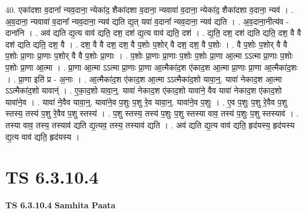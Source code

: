 \documentclass[17pt]{extarticle}
\begin{document}
40. एका॑दशा व॒दाना᳚ न्यव॒दाना॒ न्येका॑द॒ शैका॑दशा व॒दाना॒ न्यवावा॑ व॒दाना॒ न्येका॑द॒ शैका॑दशा व॒दाना॒ न्यव॑ । . अ॒व॒दाना॒ न्यवावा॑ व॒दाना᳚ न्यव॒दाना॒ न्यव॑ द्यति द्य॒त् यवा॑ व॒दाना᳚ न्यव॒दाना॒ न्यव॑ द्यति । . अ॒व॒दाना॒नीत्य॑व - दाना॑नि । . अव॑ द्यति द्य॒त्य वाव॑ द्यति॒ दश॒ दश॑ द्य॒त्य वाव॑ द्यति॒ दश॑ । . द्य॒ति॒ दश॒ दश॑ द्यति द्यति॒ दश॒ वै वै दश॑ द्यति द्यति॒ दश॒ वै । . दश॒ वै वै दश॒ दश॒ वै प॒शोः प॒शोर् वै दश॒ दश॒ वै प॒शोः । . वै प॒शोः प॒शोर् वै वै प॒शोः प्रा॒णाः प्रा॒णाः प॒शोर् वै वै प॒शोः प्रा॒णाः । . प॒शोः प्रा॒णाः प्रा॒णाः प॒शोः प॒शोः प्रा॒णा आ॒त्मा ऽऽत्मा प्रा॒णाः प॒शोः प॒शोः प्रा॒णा आ॒त्मा । . प्रा॒णा आ॒त्मा ऽऽत्मा प्रा॒णाः प्रा॒णा आ॒त्मैका॑द॒श ए॑काद॒श आ॒त्मा प्रा॒णाः प्रा॒णा आ॒त्मैका॑द॒शः । . प्रा॒णा इति॑ प्र - अ॒नाः । . आ॒त्मैका॑द॒श ए॑काद॒श आ॒त्मा ऽऽत्मैका॑द॒शो यावा॒न्॒. यावा॑ नेकाद॒श आ॒त्मा ऽऽत्मैका॑द॒शो यावान्॑ । . ए॒का॒द॒शो यावा॒न्॒. यावा॑ नेकाद॒श ए॑काद॒शो यावा॑ने॒ वैव यावा॑ नेकाद॒श ए॑काद॒शो यावा॑ने॒व । . यावा॑ ने॒वैव यावा॒न्॒. यावा॑ने॒व प॒शुः प॒शु रे॒व यावा॒न्॒. यावा॑ने॒व प॒शुः । . ए॒व प॒शुः प॒शु रे॒वैव प॒शु स्तस्य॒ तस्य॑ प॒शु रे॒वैव प॒शु स्तस्य॑ । . प॒शु स्तस्य॒ तस्य॑ प॒शुः प॒शु स्तस्या वाव॒ तस्य॑ प॒शुः प॒शु स्तस्याव॑ । . तस्या वाव॒ तस्य॒ तस्याव॑ द्यति द्य॒त्यव॒ तस्य॒ तस्याव॑ द्यति । . अव॑ द्यति द्य॒त्य वाव॑ द्यति॒ हृद॑यस्य॒ हृद॑यस्य द्य॒त्य वाव॑ द्यति॒ हृद॑यस्य । \newline
\pagebreak
{}

\section{ TS 6.3.10.4 }

\textbf{TS 6.3.10.4 } \newline
\textbf{Samhita Paata} \newline
\end{document}
